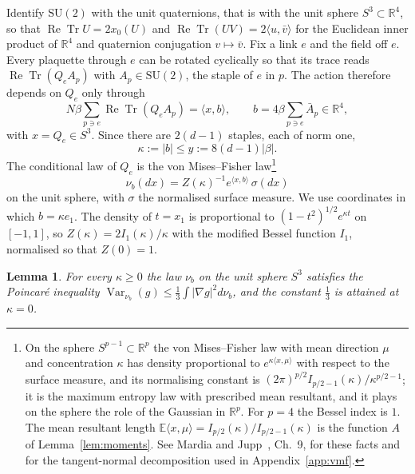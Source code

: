 \documentclass[aps,prd,twocolumn,superscriptaddress,nofootinbib,longbibliography,floatfix,amsmath,amssymb,10pt]{revtex4-2}
\newtheorem{lemma}[theorem]{Lemma}
\theoremstyle{definition}
\theoremstyle{remark}
\newcommand{\R}{\mathbb{R}}
\newcommand{\E}{\mathbb{E}}
\newcommand{\SU}{\mathrm{SU}}
\newcommand{\ReTr}{\operatorname{Re}\operatorname{Tr}}
\newcommand{\Var}{\operatorname{Var}}
\newcommand{\ip}[2]{\langle #1,#2\rangle}
\begin{document}
Identify $\SU(2)$ with the unit quaternions, that is with the unit sphere
$S^3\subset\R^4$, so that $\ReTr U=2x_0(U)$ and $\ReTr(UV)=2\ip u{\bar v}$
for the Euclidean inner product of $\R^4$ and quaternion conjugation
$v\mapsto\bar v$. Fix a link $e$ and the field off $e$. Every plaquette
through $e$ can be rotated cyclically so that its trace reads $\ReTr(Q_eA_p)$
with $A_p\in\SU(2)$, the staple of $e$ in $p$. The action therefore depends on
$Q_e$ only through
\[
N\beta\sum_{p\ni e}\ReTr(Q_eA_p)=\ip{x}{b},\qquad
b=4\beta\sum_{p\ni e}\bar A_p\in\R^4,
\]
with $x=Q_e\in S^3$. Since there are $2(d-1)$ staples, each of norm one,
\begin{equation}\label{eq:kappamax}
\kappa:=|b|\le y:=8(d-1)|\beta| .
\end{equation}
The conditional law of $Q_e$ is the von Mises--Fisher law\footnote{On the
sphere $S^{p-1}\subset\R^p$ the von Mises--Fisher law with mean direction
$\mu$ and concentration $\kappa$ has density proportional to
$e^{\kappa\ip x\mu}$ with respect to the surface measure, and its normalising
constant is $(2\pi)^{p/2}I_{p/2-1}(\kappa)/\kappa^{p/2-1}$; it is the maximum
entropy law with prescribed mean resultant, and it plays on the sphere the
role of the Gaussian in $\R^p$. For $p=4$ the Bessel index is $1$. The mean
resultant length $\E\ip x\mu=I_{p/2}(\kappa)/I_{p/2-1}(\kappa)$ is the
function $A$ of Lemma~\ref{lem:moments}. See Mardia and Jupp~\cite{MJ00},
Ch.~9, for these facts and for the tangent-normal decomposition used in
Appendix~\ref{app:vmf}.}
\begin{equation}\label{eq:vmf}
\nu_b(dx)=Z(\kappa)^{-1}e^{\ip xb}\,\sigma(dx)
\end{equation}
on the unit sphere, with $\sigma$ the normalised surface measure. We use
coordinates in which $b=\kappa e_1$. The density of $t=x_1$ is proportional
to $(1-t^2)^{1/2}e^{\kappa t}$ on $[-1,1]$, so $Z(\kappa)=2I_1(\kappa)/\kappa$
with the modified Bessel function $I_1$, normalised so that $Z(0)=1$.

\begin{lemma}\label{lem:vmf}
For every $\kappa\ge0$ the law $\nu_b$ on the unit sphere $S^3$ satisfies
the Poincar\'e inequality $\Var_{\nu_b}(g)\le\frac13\int|\nabla g|^2d\nu_b$,
and the constant $\frac13$ is attained at $\kappa=0$.
\end{lemma}
\end{document}
